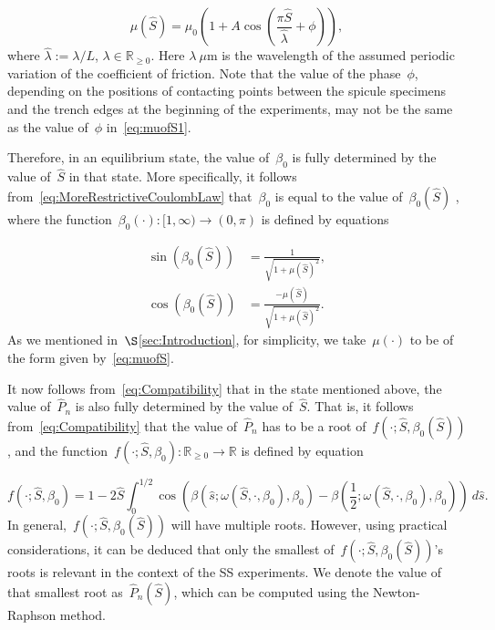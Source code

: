 \documentclass[preprint,10pt,times]{elsarticle}
\numberwithin{equation}{section}
\newcommand{\pr}[1]{\left( #1 \right)}
\begin{document}
\begin{equation}
\mu\pr{\hat{S}}=\mu_{0}\left(1+A\cos\left(\frac{ \pi \hat{S}}{\hat{\lambda}}+\phi\right)\right),\label{eq:muofS}
\end{equation}
where $\hat{\lambda}:=\lambda/L$, $\lambda \in \mathbb{R}_{\ge0}$. Here $\lambda~\mu$m is the wavelength of the assumed periodic variation of the coefficient of friction. Note that the value of the phase~$\phi$, depending on the positions
of contacting points between the spicule specimens and the trench
edges at the beginning of the experiments, may not be the same as
the value of~$\phi$ in~\eqref{eq:muofS1}.

Therefore, in an equilibrium state, the value of~$\beta_0$ is fully
determined by the value of~$\hat{S}$ in that state. More specifically,
it follows from~\eqref{eq:MoreRestrictiveCoulombLaw} that~$\beta_0$
is equal to the value of~$\beta_0\pr{\hat{S}}$ , where the function~$\beta_0(\cdot):[1,\infty)\to (0,\pi)$
is defined by equations

\begin{subequations}
\begin{align}
\sin\pr{\beta_0\pr{\hat{S}}}&=\frac{1}{\sqrt{1+\mu\pr{\hat{S}}^2}},\\
\cos\pr{\beta_0\pr{\hat{S}}}&=\frac{-\mu\pr{\hat{S}}}{\sqrt{1+\mu\pr{\hat{S}}^2}}.
\end{align}
\label{eq:FrictionLaw}
\end{subequations}As we mentioned in~$\S$\ref{sec:Introduction}, for simplicity,
we take~$\mu(\cdot)$ to be of the form given by~\eqref{eq:muofS}.

It now follows from~\eqref{eq:Compatibility} that in the state mentioned
above, the value of~$\hat{P}_n$ is also fully determined by the
value of~$\hat{S}$. That is, it follows from~\eqref{eq:Compatibility}
that the value of~$\hat{P}_n$ has to be a root of~$f\pr{\cdot;\hat{S},\beta_0\pr{\hat{S}}}$,
and the function~$f\left(\cdot;\hat{S},\beta_0\right):\mathbb{R}_{\ge 0}\to\mathbb{R}$
is defined by equation

\begin{equation}
f\left(\ensuremath{\cdot};\hat{S},\beta_0\right)=1-2\hat{S}\int_{0}^{1/2}\cos\left(\beta\left(\hat{s};\omega(\hat{S},\cdot,\beta_{0}),\beta_{0}\right)-\beta\left(\frac{1}{2};\omega(\hat{S},\cdot,\beta_{0}),\beta_{0}\right)\right)\ d\hat{s}.
\label{eq:ClosingEquation}
\end{equation}
In general,~$f\pr{\cdot;\hat{S},\beta_0\pr{\hat{S}}}$ will have multiple
roots. However, using practical considerations, it can be deduced
that only the smallest of~$f\pr{\cdot;\hat{S},\beta_0\pr{\hat{S}}}$'s
roots is relevant in the context of the SS experiments. We denote
the value of that smallest root as~$\hat{P}_n\pr{\hat{S}}$, which
can be computed using the Newton-Raphson method.
\end{document}
